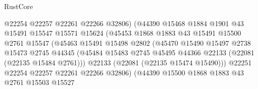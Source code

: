 \begin{lexlean}{RustCore}
\begin{coremodule}
                                    @22254
                                    @22257
                                    @22261
                                    @22266
                                    @32806)
                                  (@44390
                                    @15468
                                    @1884
                                    @1901
                                    @43
                                    @15491
                                    @15547
                                    @15571
                                    @15624
                                    (@45453
                                      @1868
                                      @1883
                                      @43
                                      @15491
                                      @15500
                                      @2761
                                      @15547
                                      (@45463
                                        @15491
                                        @15498
                                        @2802
                                        (@45470
                                          @15490
                                          @15497
                                          @2738
                                          @15473
                                          @2745
                                          @44345
                                          (@45484
                                            @15483
                                            @2745
                                            @45495
                                            @44366
                                            @22133
                                            (@22081 (@22135 @15484 @2761)))
                                          @22133
                                          (@22081 (@22135 @15474 @15490)))
                                        @22251
                                        @22254
                                        @22257
                                        @22261
                                        @22266
                                        @32806)
                                      (@44390
                                        @15500
                                        @1868
                                        @1883
                                        @43
                                        @2761
                                        @15503
                                        @15527

\end{coremodule}
\end{lexlean}
